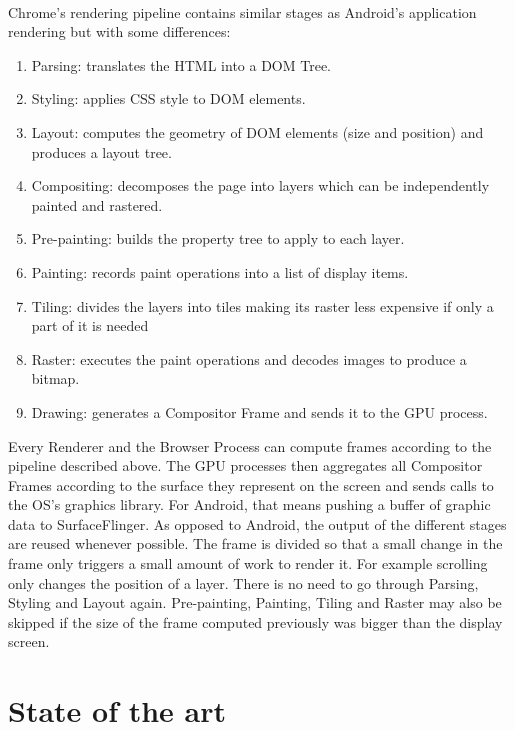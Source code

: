 \documentclass{kththesis}
\begin{document}
\paragraph{}
Chrome's rendering pipeline \cite{chrome_pixel} contains similar stages as Android's application rendering but with some differences: 
\begin{enumerate}
    \item Parsing: translates the HTML into a DOM Tree.
    \item Styling: applies CSS style to DOM elements.
    \item Layout: computes the geometry of DOM elements (size and position) and produces a layout tree.
    \item Compositing: decomposes the page into layers which can be independently painted and rastered.
    \item Pre-painting: builds the property tree to apply to each layer.
    \item Painting: records paint operations into a list of display items.
    \item Tiling: divides the layers into tiles making its raster less expensive if only a part of it is needed
    \item Raster: executes the paint operations and decodes images to produce a bitmap.
    \item Drawing: generates a Compositor Frame and sends it to the GPU process.
\end{enumerate}
Every Renderer and the Browser Process can compute frames according to the pipeline described above. The GPU processes then aggregates all Compositor Frames according to the surface they represent on the screen and sends calls to the OS's graphics library. For Android, that means pushing a buffer of graphic data to SurfaceFlinger.
\newline
As opposed to Android, the output of the different stages are reused whenever possible. The frame is divided so that a small change in the frame only triggers a small amount of work to render it. 
For example scrolling only changes the position of a layer. There is no need to go through Parsing, Styling and Layout again. Pre-painting, Painting, Tiling and Raster may also be skipped if the size of the frame computed previously was bigger than the display screen.

\section{State of the art} 
\end{document}

